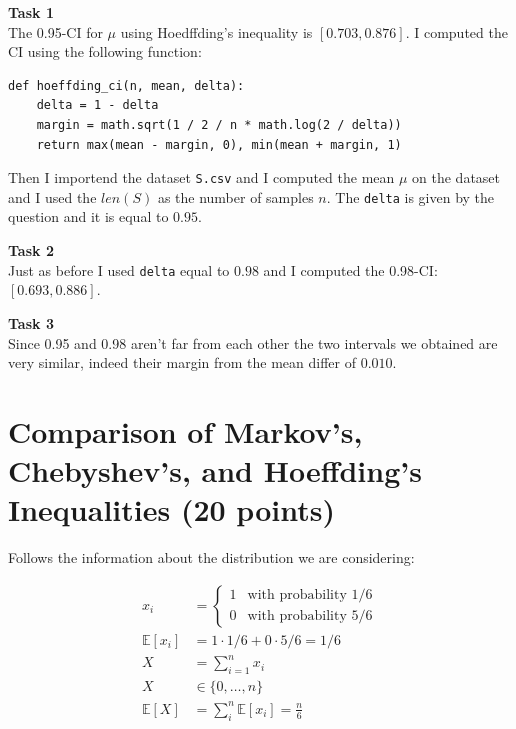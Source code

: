 \documentclass[a4paper,12pt]{article}
\begin{document}
\vspace{1em}
\noindent\textbf{Task 1}\\
The 0.95-CI for $\mu$ using Hoedffding's inequality is $[0.703, 0.876]$.
I computed the CI using the following function:

\begin{lstlisting}
def hoeffding_ci(n, mean, delta):
    delta = 1 - delta
    margin = math.sqrt(1 / 2 / n * math.log(2 / delta))
    return max(mean - margin, 0), min(mean + margin, 1)
\end{lstlisting}

Then I importend the dataset \texttt{S.csv} and I computed the mean $\mu$ on the
dataset and I used the $len(S)$ as the number of samples $n$. The \texttt{delta}
is given by the question and it is equal to $0.95$.

\vspace{1em}
\noindent\textbf{Task 2}\\
Just as before I used \texttt{delta} equal to $0.98$ and I computed the 0.98-CI:
$[0.693, 0.886]$.

\vspace{1em}
\noindent\textbf{Task 3}\\
Since 0.95 and 0.98 aren't far from each other the two intervals we obtained
are very similar, indeed their margin from the mean differ of
$0.010$.

\section{Comparison of Markov's, Chebyshev's, and Hoeffding's Inequalities (20 points)}

Follows the information about the distribution we are considering:

\begin{align}
	x_i             & = \begin{cases}
		                    1 & \text{with probability } 1/6 \\
		                    0 & \text{with probability } 5/6
	                    \end{cases}
	\\
	\mathbb{E}[x_i] & = 1 \cdot 1/6 + 0 \cdot 5/6 = 1/6          \\
	X               & = \sum_{i=1}^{n} x_i                       \\
	X               & \in \{0, \dots, n\}                        \\
	\mathbb{E}[X]   & = \sum_i^{n} \mathbb{E}[x_i] = \frac{n}{6} \\
\end{align}
\end{document}
